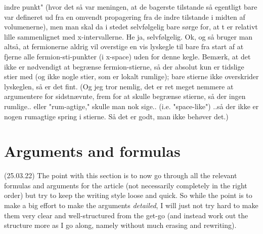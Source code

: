 \documentclass{report}
\begin{document}
indre punkt" (hvor det så var meningen, at de bagerste tilstande så egentligt bare var defineret ud fra en omvendt propagering fra de indre tilstande i midten af volumenerne), men man skal da i stedet selvfølgelig bare sørge for, at t er relativt lille sammenlignet med x-intervallerne. He ja, selvfølgelig. Ok, og så bruger man altså, at fermionerne aldrig vil overstige en vis lyskegle til bare fra start af at fjerne alle fermion-sti-punkter (i x-space) uden for denne kegle. Bemærk, at det ikke er nødvendigt at begrænse fermion-stierne, så der absolut kun er tidslige stier med (og ikke nogle stier, som er lokalt rumlige); bare stierne ikke overskrider lyskeglen, så er det fint. (Og jeg tror nemlig, det er ret meget nemmere at argumentere for sidstnævnte, frem for at skulle begrænse stierne, så der ingen rumlige.. eller "rum-agtige," skulle man nok sige.. (i.e. "space-like") ..så der ikke er nogen rumagtige spring i stierne. Så det er godt, man ikke behøver det.)


\section{Arguments and formulas}
(25.03.22) The point with this section is to now go through all the relevant formulas and arguments for the article (not necessarily completely in the right order) but try to keep the writing style loose and quick. So while the point is to make a big effort to make the arguments \emph{detailed}, I will just not try hard to make them very clear and well-structured from the get-go (and instead work out the structure more as I go along, namely without much erasing and rewriting).
\end{document}
